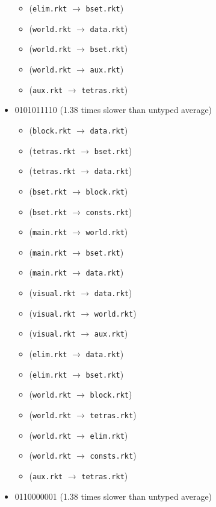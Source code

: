 \documentclass{article}
\newcommand{\mono}[1]{\texttt{#1}}
\begin{document}
\begin{itemize}
\begin{itemize}
  \item (\mono{elim.rkt} $\rightarrow$ \mono{bset.rkt})
  \item (\mono{world.rkt} $\rightarrow$ \mono{data.rkt})
  \item (\mono{world.rkt} $\rightarrow$ \mono{bset.rkt})
  \item (\mono{world.rkt} $\rightarrow$ \mono{aux.rkt})
  \item (\mono{aux.rkt} $\rightarrow$ \mono{tetras.rkt})
  \end{itemize}
\item 0101011110 (1.38 times slower than untyped average)
  \begin{itemize}
  \item (\mono{block.rkt} $\rightarrow$ \mono{data.rkt})
  \item (\mono{tetras.rkt} $\rightarrow$ \mono{bset.rkt})
  \item (\mono{tetras.rkt} $\rightarrow$ \mono{data.rkt})
  \item (\mono{bset.rkt} $\rightarrow$ \mono{block.rkt})
  \item (\mono{bset.rkt} $\rightarrow$ \mono{consts.rkt})
  \item (\mono{main.rkt} $\rightarrow$ \mono{world.rkt})
  \item (\mono{main.rkt} $\rightarrow$ \mono{bset.rkt})
  \item (\mono{main.rkt} $\rightarrow$ \mono{data.rkt})
  \item (\mono{visual.rkt} $\rightarrow$ \mono{data.rkt})
  \item (\mono{visual.rkt} $\rightarrow$ \mono{world.rkt})
  \item (\mono{visual.rkt} $\rightarrow$ \mono{aux.rkt})
  \item (\mono{elim.rkt} $\rightarrow$ \mono{data.rkt})
  \item (\mono{elim.rkt} $\rightarrow$ \mono{bset.rkt})
  \item (\mono{world.rkt} $\rightarrow$ \mono{block.rkt})
  \item (\mono{world.rkt} $\rightarrow$ \mono{tetras.rkt})
  \item (\mono{world.rkt} $\rightarrow$ \mono{elim.rkt})
  \item (\mono{world.rkt} $\rightarrow$ \mono{consts.rkt})
  \item (\mono{aux.rkt} $\rightarrow$ \mono{tetras.rkt})
  \end{itemize}
\item 0110000001 (1.38 times slower than untyped average)

\end{itemize}
\end{document}
